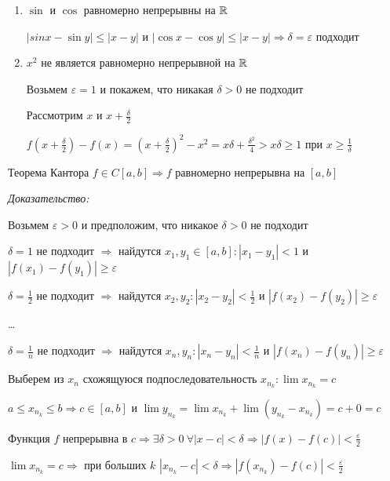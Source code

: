 \documentclass[12pt]{article}
\begin{document}
\begin{Example}{}
    \begin{enumerate}
        \item $\sin$ и $\cos$ равномерно непрерывны на $\mathbb R$
        
        $|sin{x} - \sin{y}| \leq |x - y|$ и $|\cos{x} - \cos{y}| \leq |x - y| \Rightarrow \delta = \varepsilon$ подходит

        \item $x^2$ не является равномерно непрерывной на $\mathbb R$
        
        Возьмем $\varepsilon = 1$ и покажем, что никакая $\delta > 0$ не подходит

        Рассмотрим $x$ и $x + \frac{\delta}{2}$

        $f(x + \frac{\delta}{2}) - f(x) = (x + \frac{\delta}{2})^2 - x^2 = x\delta + \frac{\delta^2}{4} > x\delta \geq 1$ при $x \geq \frac{1}{\delta}$
    \end{enumerate}
\end{Example}

\begin{theo}{Теорема Кантора}
    $f \in C[a, b] \Rightarrow f$ равномерно непрерывна на $[a, b]$
\end{theo}

\textit{Доказательство:}

Возьмем $\varepsilon > 0$ и предположим, что никакое $\delta > 0$ не подходит

$\delta = 1$ не подходит $\Rightarrow$ найдутся $x_1, y_1 \in [a, b] : |x_1 - y_1| < 1$ и $|f(x_1) - f(y_1)| \geq \varepsilon$

$\delta = \frac{1}{2}$ не подходит $\Rightarrow$ найдутся $x_2, y_2 : |x_2 - y_2| < \frac{1}{2}$ и $|f(x_2) - f(y_2)| \geq \varepsilon$

\ldots

$\delta = \frac{1}{n}$ не подходит $\Rightarrow$ найдутся $x_n, y_n : |x_n - y_n| < \frac{1}{n}$ и $|f(x_n) - f(y_n)| \geq \varepsilon$

Выберем из $x_n$ схожящуюся подпоследовательность $x_{n_k} : \lim x_{n_k} = c$

$a \leq x_{n_k} \leq b \Rightarrow c \in [a, b]$ и $\lim y_{n_k} = \lim x_{n_k} + \lim (y_{n_k} - x_{n_k}) = c + 0 = c$

Функция $f$ непрерывна в $c \Rightarrow \exists \delta > 0\ \forall |x - c| < \delta \Rightarrow |f(x) - f(c)| < \frac{\varepsilon}{2}$

$\lim x_{n_k} = c \Rightarrow$ при больших $k$ $|x_{n_k} - c| < \delta \Rightarrow |f(x_{n_k}) - f(c)| < \frac{\varepsilon}{2}$
\end{document}
